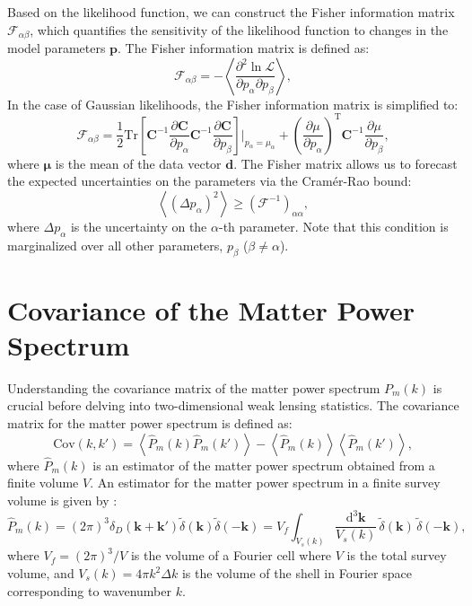 Based on the likelihood function, we can construct the Fisher information matrix $\mathcal{F}_{\alpha\beta}$, which quantifies the sensitivity of the likelihood function to changes in the model parameters $\mathbf{p}$. The Fisher information matrix is defined as:
\begin{equation}
    \mathcal{F}_{\alpha\beta} = -\left\langle \frac{\partial^2 \ln \mathcal{L}}{\partial p_\alpha \partial p_\beta} \right\rangle,
\end{equation}
In the case of Gaussian likelihoods, the Fisher information matrix is simplified to:
\begin{equation}
    \mathcal{F}_{\alpha\beta} = \frac{1}{2} \mathrm{Tr} \left[ \mathbf{C}^{-1} \frac{\partial \mathbf{C}}{\partial p_\alpha} \mathbf{C}^{-1} \frac{\partial \mathbf{C}}{\partial p_\beta} \right]\Bigg|_{p_\alpha = \mu_\alpha} + \left(\frac{\partial \mu}{\partial p_\alpha}\right)^{\mathrm{T}} \mathbf{C}^{-1} \frac{\partial \mu}{\partial p_\beta},
\end{equation}
where $\mathbf{\mu}$ is the mean of the data vector $\mathbf{d}$. The Fisher matrix allows us to forecast the expected uncertainties on the parameters via the Cramér-Rao bound:
\begin{equation}
    \left\langle (\Delta p_\alpha)^2 \right\rangle \geq (\mathcal{F}^{-1})_{\alpha\alpha},
\end{equation}
where $\Delta p_\alpha$ is the uncertainty on the $\alpha$-th parameter. Note that this condition is marginalized over all other parameters, $p_\beta$ ($\beta \neq \alpha$).

\section{Covariance of the Matter Power Spectrum}
Understanding the covariance matrix of the matter power spectrum \( P_m(k) \) is crucial before delving into two-dimensional weak lensing statistics. 
The covariance matrix for the matter power spectrum is defined as:
\begin{equation}
    \mathrm{Cov}(k, k') = \left\langle \hat{P}_m(k) \hat{P}_m(k') \right\rangle - \left\langle \hat{P}_m(k) \right\rangle \left\langle \hat{P}_m(k') \right\rangle,
\end{equation}
where \( \hat{P}_m(k) \) is an estimator of the matter power spectrum obtained from a finite volume \( V \).
An estimator for the matter power spectrum in a finite survey volume is given by \citep{1994ApJ...426...23F}:
\begin{equation}
    \hat{P}_m(k) = (2\pi)^3 \delta_D(\mathbf{k} + \mathbf{k'}) \tilde{\delta}(\mathbf{k}) \tilde{\delta}(-\mathbf{k}) = V_f \int_{V_s(k)} \frac{\mathrm{d}^3 \mathbf{k}}{V_s(k)} \, \tilde{\delta}(\mathbf{k}) \, \tilde{\delta}(-\mathbf{k}),
\end{equation}
where $V_f = (2\pi)^3 / V$ is the volume of a Fourier cell where $V$ is the total survey volume, and $V_s(k) = 4\pi k^2 \Delta k$ is the volume of the shell in Fourier space corresponding to wavenumber \( k \).

